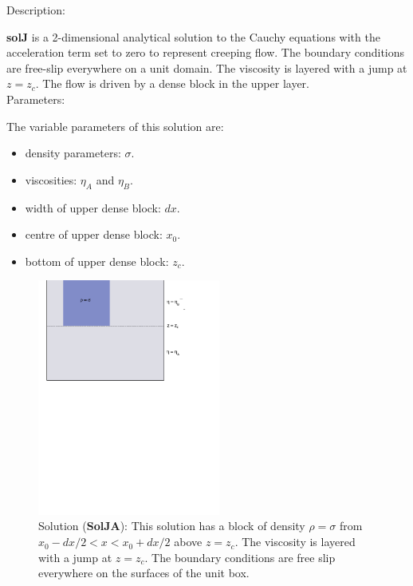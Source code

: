   {\large \fontB Description:}
  
  {\bf solJ} is a 2-dimensional analytical solution to the Cauchy equations with the acceleration term set to zero
  to represent creeping flow. The boundary conditions are free-slip everywhere on a unit domain. 
  The viscosity is layered with a jump at $ z=z_c $.
  The flow is driven by a dense block in the upper layer.
  \\

  {\large \fontB Parameters:}
 
  The variable parameters of this solution are:
  \begin{itemize}
    \item{density parameters: $ \sigma $.}
    \item{viscosities: $\eta_A$ and $\eta_B$.}
    \item{width of upper dense block: $dx$.}
    \item{centre of upper dense block: $x_0$.}
    \item{bottom of upper dense block: $z_c$.}
    \end{itemize}

  \begin{figure}
    \includegraphics[width=6cm,clip]{../figs/figJA.pdf}
    \caption[Short caption]{\label{figJA} 
      Solution ({\bf SolJA}):
      This solution has a block of density $\rho = \sigma$ from $x_{0}-dx/2 < x < x_{0}+dx/2$ above
      $ z= z_c$.
      The viscosity is layered with a jump at $ z=z_c $.
      The boundary conditions are free slip everywhere on the surfaces of the unit box.}
  \end{figure} 
  

